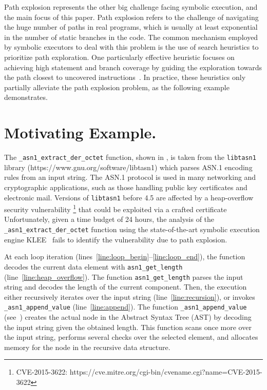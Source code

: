 Path explosion represents the other big challenge facing symbolic
execution, and the main focus of this paper.  Path explosion refers to
the challenge of navigating the huge number of paths in real programs,
which is usually at least exponential in the number of static branches
in the code. The common mechanism employed by symbolic executors to
deal with this problem is the use of search heuristics to prioritize
path exploration. One particularly effective heuristic focuses on
achieving high statement and branch coverage by guiding the
exploration towards the path closest to uncovered
instructions~\cite{exe,klee,sen:concolicheuristics,fitsymex:dsn09}.
In practice, these heuristics only partially alleviate the path
explosion problem, as the following example demonstrates.

\section{Motivating Example.}
The \texttt{\_asn1\_extract\_der\_octet} function, shown in ,
is taken from the \texttt{libtasn1} library (https://www.gnu.org/software/libtasn1)
which parses ASN.1 encoding rules from an input string.
The ASN.1 protocol is used in many networking and
cryptographic applications, such as those handling public key
certificates and electronic mail.
Versions of \texttt{libtasn1} before 4.5 are affected by a heap-overflow 
security vulnerability \footnote{CVE-2015-3622: https://cve.mitre.org/cgi-bin/cvename.cgi?name=CVE-2015-3622}
that could be exploited via a crafted certificate
Unfortunately, given a time budget of 24 hours,
the analysis of the \texttt{\_asn1\_extract\_der\_octet} function using
the state-of-the-art symbolic execution engine KLEE~\cite{klee} fails
to identify the vulnerability due to path explosion.

At each loop iteration (lines~\ref{line:loop_begin}--\ref{line:loop_end}),
the function decodes the current data element with \texttt{asn1\_get\_length} (line~\ref{line:heap_overflow}).
The function \texttt{asn1\_get\_length} parses the input string and decodes the length of the current component.
Then, the execution either recursively iterates over the input string (line~\ref{line:recursion}),
or invokes \texttt{\_asn1\_append\_value} (line~\ref{line:append}).
The function \texttt{\_asn1\_append\_value} (see~) creates the
actual node in the Abstract Syntax Tree (AST) by decoding the input
string given the obtained length. This function scans once more over
the input string, performs several checks over the selected element,
and allocates memory for the node in the recursive data structure.

